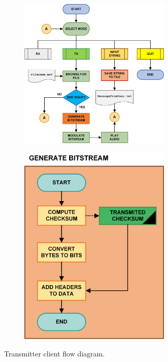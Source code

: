 \documentclass[12pt,a4paper,openright]{report}
\begin{document}
 \begin{figure}[H]
 \centering
 \begin{subfigure}[t]{.7\textwidth}
 \centering
    \includegraphics[width=0.8\textwidth]{TXschem.png}
    \label{fig:TXclientFull}
    \end{subfigure}%
 \begin{subfigure}[t]{.3\textwidth}
  	 \centering
      \includegraphics[width=0.8\textwidth]{schemGenBS.png}
      \label{fig:TXclientRecFile}
   \end{subfigure}
    \label{fig:TXclient}
    \caption[Transmitter client flow diagram]{Transmitter client flow diagram.}
 \end{figure} 
\end{document}
